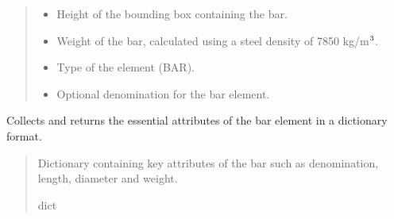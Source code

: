 \documentclass[a4paper,10pt,english]{sphinxmanual}
\begin{document}
\begin{fulllineitems}
\begin{quote}
\begin{description}
\begin{itemize}
\item {} 
\sphinxAtStartPar
{} \textendash{} Height of the bounding box containing the bar.

\item {} 
\sphinxAtStartPar
{} \textendash{} Weight of the bar, calculated using a steel density of 7850 kg/m\(\sp{\text{3}}\).

\item {} 
\sphinxAtStartPar
{} \textendash{} Type of the element (BAR).

\item {} 
\sphinxAtStartPar
{} \textendash{} Optional denomination for the bar element.

\end{itemize}

\end{description}\end{quote}

\begin{fulllineitems}
\label{\detokenize{API:etacad.bar.Bar.data}}
\pysigstartsignatures
{}
\pysigstopsignatures
\sphinxAtStartPar
Collects and returns the essential attributes of the bar element in a dictionary format.
\begin{quote}\begin{description}
\sphinxAtStartPar
Dictionary containing key attributes of the bar such as denomination, length, diameter and weight.

\sphinxAtStartPar
dict

\end{description}\end{quote}

\end{fulllineitems}



\end{fulllineitems}
\end{document}
